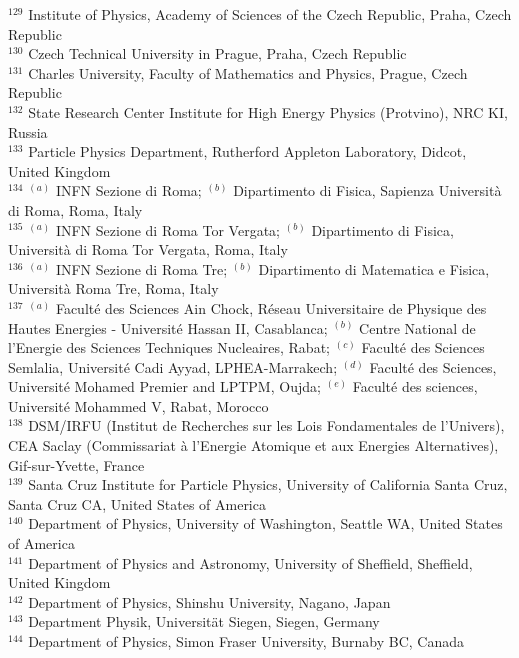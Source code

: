 \begin{flushleft}
$^{129}$ Institute of Physics, Academy of Sciences of the Czech Republic, Praha, Czech Republic\\
$^{130}$ Czech Technical University in Prague, Praha, Czech Republic\\
$^{131}$ Charles University, Faculty of Mathematics and Physics, Prague, Czech Republic\\
$^{132}$ State Research Center Institute for High Energy Physics (Protvino), NRC KI, Russia\\
$^{133}$ Particle Physics Department, Rutherford Appleton Laboratory, Didcot, United Kingdom\\
$^{134}$ $^{(a)}$ INFN Sezione di Roma; $^{(b)}$ Dipartimento di Fisica, Sapienza Universit{\`a} di Roma, Roma, Italy\\
$^{135}$ $^{(a)}$ INFN Sezione di Roma Tor Vergata; $^{(b)}$ Dipartimento di Fisica, Universit{\`a} di Roma Tor Vergata, Roma, Italy\\
$^{136}$ $^{(a)}$ INFN Sezione di Roma Tre; $^{(b)}$ Dipartimento di Matematica e Fisica, Universit{\`a} Roma Tre, Roma, Italy\\
$^{137}$ $^{(a)}$ Facult{\'e} des Sciences Ain Chock, R{\'e}seau Universitaire de Physique des Hautes Energies - Universit{\'e} Hassan II, Casablanca; $^{(b)}$ Centre National de l'Energie des Sciences Techniques Nucleaires, Rabat; $^{(c)}$ Facult{\'e} des Sciences Semlalia, Universit{\'e} Cadi Ayyad, LPHEA-Marrakech; $^{(d)}$ Facult{\'e} des Sciences, Universit{\'e} Mohamed Premier and LPTPM, Oujda; $^{(e)}$ Facult{\'e} des sciences, Universit{\'e} Mohammed V, Rabat, Morocco\\
$^{138}$ DSM/IRFU (Institut de Recherches sur les Lois Fondamentales de l'Univers), CEA Saclay (Commissariat {\`a} l'Energie Atomique et aux Energies Alternatives), Gif-sur-Yvette, France\\
$^{139}$ Santa Cruz Institute for Particle Physics, University of California Santa Cruz, Santa Cruz CA, United States of America\\
$^{140}$ Department of Physics, University of Washington, Seattle WA, United States of America\\
$^{141}$ Department of Physics and Astronomy, University of Sheffield, Sheffield, United Kingdom\\
$^{142}$ Department of Physics, Shinshu University, Nagano, Japan\\
$^{143}$ Department Physik, Universit{\"a}t Siegen, Siegen, Germany\\
$^{144}$ Department of Physics, Simon Fraser University, Burnaby BC, Canada\\

\end{flushleft}
